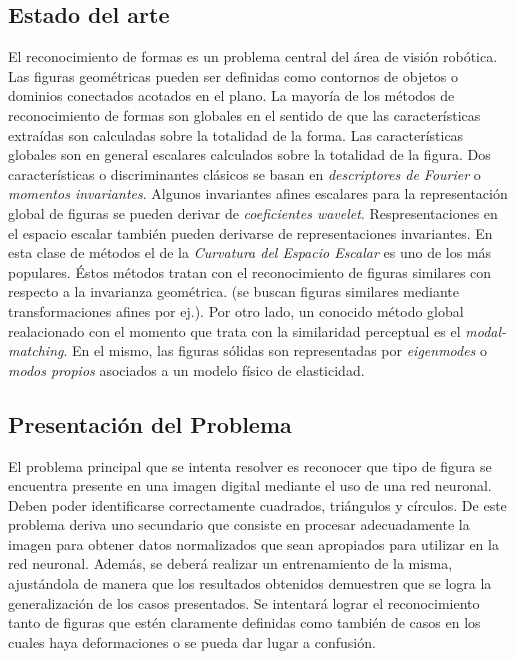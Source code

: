 \documentclass[pdftex,a4paper,10.5pt]{article}
\begin{document}
\subsection{Estado del arte \cite{campilho}}
El reconocimiento de formas es un problema central del \'area de visi\'on rob\'otica. Las figuras geom\'etricas pueden ser definidas como contornos de objetos o dominios conectados acotados en el plano. La mayor\'ia de los  m\'etodos de reconocimiento de formas son globales en el sentido de que las caracter\'isticas extra\'idas son calculadas sobre la totalidad de la forma. Las caracter\'isticas globales son en general escalares calculados sobre la totalidad de la figura. Dos caracter\'isticas o discriminantes cl\'asicos se basan en \textit{descriptores de Fourier}\cite{fourierdescriptors} o \textit{momentos invariantes}. Algunos invariantes afines escalares para la representaci\'on global de figuras se pueden derivar de \textit{coeficientes wavelet}. Respresentaciones en el espacio escalar tambi\'en pueden derivarse de representaciones invariantes. En esta clase de m\'etodos el de la \textit{Curvatura del Espacio Escalar}\cite{curvaturescale} es uno de los m\'as populares. \'Estos m\'etodos tratan con el reconocimiento de figuras similares con respecto a la invarianza geom\'etrica. (se buscan figuras similares mediante transformaciones afines por ej.). Por otro lado, un conocido m\'etodo global realacionado con el momento que trata con la similaridad perceptual es el \textit{modal-matching}. En el mismo, las figuras s\'olidas son representadas por \textit{eigenmodes} o \textit{modos propios} asociados a un modelo f\'isico de elasticidad.

\subsection{Presentaci\'on del Problema}
El problema principal que se intenta resolver es reconocer que tipo de figura se encuentra presente en una imagen digital mediante el uso de una red neuronal. Deben poder identificarse correctamente cuadrados, tri\'angulos y c\'irculos. De este problema deriva uno secundario que consiste en procesar adecuadamente la imagen para obtener datos normalizados que sean apropiados para utilizar en la red neuronal. Adem\'as, se deber\'a realizar un entrenamiento de la misma, ajust\'andola de manera que los resultados obtenidos demuestren que se logra la generalizaci\'on de los casos presentados. Se intentar\'a lograr el reconocimiento tanto de figuras que est\'en claramente definidas como tambi\'en de casos en los cuales haya deformaciones o se pueda dar lugar a confusi\'on.
\end{document}
